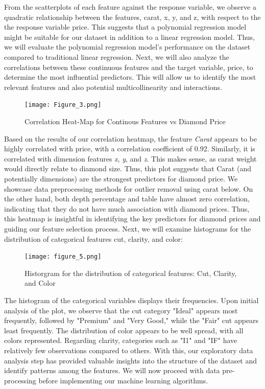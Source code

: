 \documentclass[conference]{IEEEtran}
\begin{document}
From the scatterplots of each feature against the response variable, we observe a quadratic relationship between the features, carat, x, y, and z, with respect to the the response variable price. This suggests that a polynomial regression model might be suitable for our dataset in addition to a linear regression model. Thus, we will evaluate the polynomial regression model's performance on the dataset compared to traditional linear regression. Next, we will also analyze the correlations between these continuous features and the target variable, price, to determine the most influential predictors. This will allow us to identify the most relevant features and also potential multicollinearity and interactions.

\begin{figure}[H]
    \centering
    \texttt{[image: Figure\_3.png]} %
    \caption{Correlation Heat-Map for Continous Features vs Diamond Price}
    \label{fig:image_label}
\end{figure}

Based on the results of our correlation heatmap, the feature \emph{Carat} appears to be highly correlated with price, with a correlation coefficient of 0.92. Similarly, it is correlated with dimension features \emph{x}, \emph{y}, and \emph{z}. This makes sense, as carat weight would directly relate to diamond size. Thus, this plot suggests that Carat (and potentially dimensions) are the strongest predictors for diamond price. We showcase data preprocessing methods for outlier removal using carat below. On the other hand, both depth percentage and table have almost zero correlation, indicating that they do not have much association with diamond prices. Thus, this heatmap is insightful in identifying the key predictors for diamond prices and guiding our feature selection process. Next, we will examine histograms for the distribution of categorical features cut, clarity, and color:

\begin{figure}[H]
    \centering
    \texttt{[image: figure\_5.png]} %
    \caption{Historgram for the distribution of categorical features: Cut, Clarity, and Color }
    \label{fig:image_label}
\end{figure}

The histogram of the categorical variables displays their frequencies. Upon initial analysis of the plot, we observe that the cut category "Ideal" appears most frequently, followed by "Premium" and "Very Good," while the "Fair" cut appears least frequently. The distribution of color appears to be well spread, with all colors represented. Regarding clarity, categories such as "I1" and "IF" have relatively few observations compared to others. With this, our exploratory data analysis step has provided valuable insights into the structure of the dataset and identify patterns among the features. We will now proceed with data pre-processing before implementing our machine learning algorithms.
\end{document}
